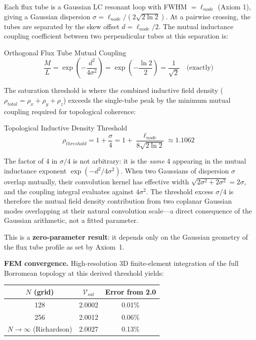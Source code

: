 Each flux tube is a Gaussian LC resonant loop with FWHM $= \ell_{node}$ (Axiom 1), giving a Gaussian dispersion $\sigma = \ell_{node}/(2\sqrt{2\ln 2})$. At a pairwise crossing, the tubes are separated by the skew offset $d = \ell_{node}/2$. The mutual inductance coupling coefficient between two perpendicular tubes at this separation is:
\begin{resultbox}{Orthogonal Flux Tube Mutual Coupling}
\begin{equation}
    \frac{M}{L} = \exp\!\left(-\frac{d^2}{4\sigma^2}\right) = \exp\!\left(-\frac{\ln 2}{2}\right) = \frac{1}{\sqrt{2}} \quad \text{(exactly)}
\end{equation}
\end{resultbox}

The saturation threshold is where the combined inductive field density ($\rho_{total} = \rho_x + \rho_y + \rho_z$) exceeds the single-tube peak by the minimum mutual coupling required for topological coherence:
\begin{resultbox}{Topological Inductive Density Threshold}
\begin{equation}
    \rho_{threshold} = 1 + \frac{\sigma}{4} = 1 + \frac{\ell_{node}}{8\sqrt{2\ln 2}} \approx 1.1062
\end{equation}
\end{resultbox}
The factor of 4 in $\sigma/4$ is not arbitrary: it is the \textit{same} 4 appearing in the mutual inductance exponent $\exp(-d^2/4\sigma^2)$. When two Gaussians of dispersion $\sigma$ overlap mutually, their convolution kernel has effective width $\sqrt{2\sigma^2 + 2\sigma^2} = 2\sigma$, and the coupling integral evaluates against $4\sigma^2$. The threshold excess $\sigma/4$ is therefore the mutual field density contribution from two coplanar Gaussian modes overlapping at their natural convolution scale---a direct consequence of the Gaussian arithmetic, not a fitted parameter.

This is a \textbf{zero-parameter result}: it depends only on the Gaussian geometry of the flux tube profile as set by Axiom~1.

\textbf{FEM convergence.} High-resolution 3D finite-element integration of the full Borromean topology at this derived threshold yields:
\begin{center}
\begin{tabular}{ccc}
\hline
$N$ (grid) & $\mathcal{V}_{sat}$ & Error from 2.0 \\ \hline
128 & 2.0002 & 0.01\% \\
256 & 2.0012 & 0.06\% \\
$N\to\infty$ (Richardson) & 2.0027 & 0.13\% \\ \hline
\end{tabular}
\end{center}

